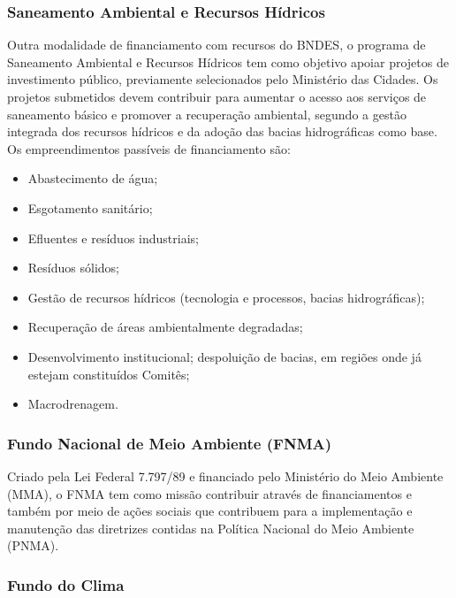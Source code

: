 	\subsubsection{Saneamento Ambiental e Recursos Hídricos}
	
	Outra modalidade de financiamento com recursos do BNDES, o programa de Saneamento Ambiental e Recursos Hídricos tem como objetivo apoiar projetos de investimento público, previamente selecionados pelo Ministério das Cidades. 
	Os projetos submetidos devem contribuir para aumentar o acesso aos serviços de saneamento básico e promover a recuperação ambiental, segundo a gestão integrada dos recursos hídricos e da adoção das bacias hidrográficas como base.
	Os empreendimentos passíveis de financiamento são:
	
	\begin{itemize}
		\item Abastecimento de água;
		\item Esgotamento sanitário;
		\item Efluentes e resíduos industriais;
		\item Resíduos sólidos;
		\item Gestão de recursos hídricos (tecnologia e processos, bacias
		hidrográficas);
		\item Recuperação de áreas ambientalmente degradadas;
		\item Desenvolvimento institucional; despoluição de bacias, em regiões
		onde já estejam constituídos Comitês;
		\item Macrodrenagem.
	\end{itemize}
	
	\subsubsection{Fundo Nacional de Meio Ambiente (FNMA)}
	
	Criado pela Lei Federal 7.797/89 e financiado pelo Ministério do Meio Ambiente (MMA), o FNMA tem como missão contribuir através de financiamentos e também por meio de ações sociais que contribuem para a implementação e manutenção das diretrizes contidas na Política Nacional do Meio Ambiente (PNMA).
	
	\subsubsection{Fundo do Clima}
	
